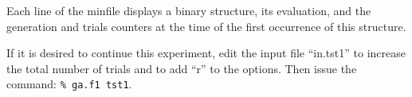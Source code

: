        Each line of the minfile displays a  binary  structure,  its
       evaluation,  and  the  generation and trials counters at the
       time of the first occurrence of this structure.
 
            If it is desired to continue this experiment, edit  the
       input  file ``in.tst1'' to increase the total number of trials
       and to add ``r'' to the options.  Then issue the command:
 	\verb/% ga.f1 tst1/.

